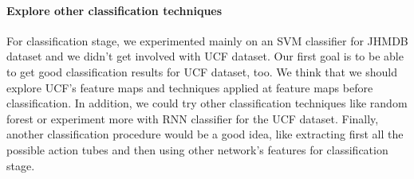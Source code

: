 \paragraph{Explore other  classification techniques}
For classification stage, we experimented mainly on an SVM classifier for JHMDB dataset and we didn't get involved with UCF dataset. Our first
goal is to be able to get good classification results for UCF dataset, too.  We think that we should explore UCF's feature maps and techniques applied at feature maps before  classification. In addition, we could try other classification techniques like random forest or experiment more with RNN classifier for the UCF dataset.
Finally, another classification procedure would be a good idea, like extracting first all the possible action tubes and then using other network's features for classification
stage.

% 
